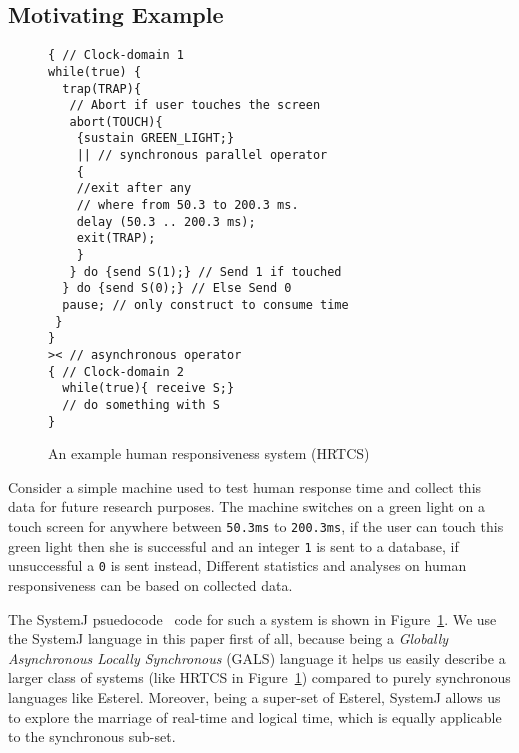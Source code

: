 \subsection{Motivating Example}
\label{sec:motivating-example}

\begin{figure}[t!]
\begin{minipage}{5cm}
  \begin{scriptsize}
    
\begin{verbatim}
{ // Clock-domain 1
while(true) {
  trap(TRAP){
   // Abort if user touches the screen
   abort(TOUCH){
    {sustain GREEN_LIGHT;}
    || // synchronous parallel operator
    {
    //exit after any 
    // where from 50.3 to 200.3 ms.
    delay (50.3 .. 200.3 ms);
    exit(TRAP); 
    }
   } do {send S(1);} // Send 1 if touched 
  } do {send S(0);} // Else Send 0
  pause; // only construct to consume time
 }
}
>< // asynchronous operator
{ // Clock-domain 2
  while(true){ receive S;}
  // do something with S
}
\end{verbatim}
  \end{scriptsize}
\end{minipage}
\caption{An example human responsiveness system (HRTCS)}
\label{fig:1}
\end{figure}

Consider a simple machine used to test human response time and collect
this data for future research purposes. The machine switches on a green
light on a touch screen for anywhere between \texttt{50.3ms} to
\texttt{200.3ms}, if the user can touch this green light then she is
successful and an integer \texttt{1} is sent to a database, if
unsuccessful a \texttt{0} is sent instead, Different statistics and
analyses on human responsiveness can be based on collected data.

The SystemJ psuedocode~\cite{amal10} code for such a system is shown in
Figure~\ref{fig:1}. We use the SystemJ language in this paper first of
all, because being a \textit{Globally Asynchronous Locally Synchronous}
(GALS) language it helps us easily describe a larger class of systems
(like HRTCS in Figure~\ref{fig:1}) compared to purely synchronous
languages like Esterel. Moreover, being a super-set of Esterel, SystemJ
allows us to explore the marriage of real-time and logical time, which
is equally applicable to the synchronous sub-set.

